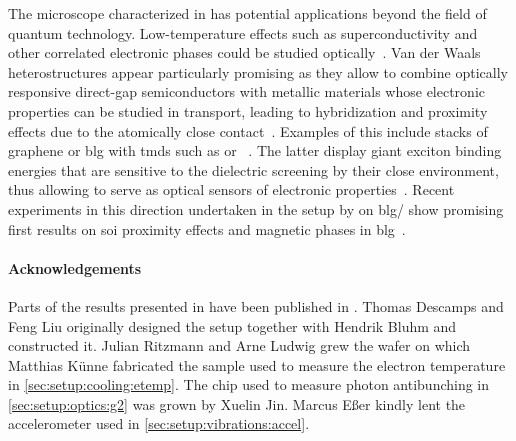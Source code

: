 The microscope characterized in \thispart has potential applications beyond the field of quantum technology.
Low-temperature effects such as superconductivity and other correlated electronic phases could be studied optically~\cite{Hadfield2016,Arora2020,Zhang2023}.
Van der Waals heterostructures appear particularly promising as they allow to combine optically responsive direct-gap semiconductors with metallic materials whose electronic properties can be studied in transport, leading to hybridization and proximity effects due to the atomically close contact~\cite{Geim2013}.
Examples of this include stacks of graphene or \gls{blg} with \glspl{tmd} such as  or ~\cite{Popert2022,Masseroni2024,Xie2024,Seiler2025}.
The latter display giant exciton binding energies that are sensitive to the dielectric screening by their close environment, thus allowing to serve as optical sensors of electronic properties~\cite{Popert2022,Tebbe2023}.
Recent experiments in this direction undertaken in the setup by \citet{Tebbe2025} on \acrshort{blg}/ show promising first results on \gls{soi} proximity effects and magnetic phases in \gls{blg}~\cite{Icking2024}.

\paragraph{Acknowledgements}
Parts of the results presented in \thispart have been published in .
Thomas Descamps and Feng Liu originally designed the setup together with Hendrik Bluhm and constructed it.
Julian Ritzmann and Arne Ludwig grew the wafer on which Matthias Künne fabricated the sample used to measure the electron temperature in \cref{sec:setup:cooling:etemp}.
The chip used to measure photon antibunching in \cref{sec:setup:optics:g2} was grown by Xuelin Jin.
Marcus Eßer kindly lent the accelerometer used in \cref{sec:setup:vibrations:accel}.